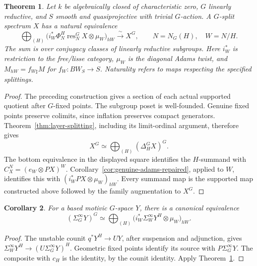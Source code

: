 \documentclass[11pt,reqno]{amsart}
\newtheorem{theorem}{Theorem}[section]
\newtheorem{corollary}[theorem]{Corollary}
\theoremstyle{definition}
\theoremstyle{remark}
\theoremstyle{plain}
\numberwithin{equation}{section}
\begin{document}
\begin{theorem}\label{thm:td-general}
Let \(k\) be algebraically closed of characteristic zero,
\(G\) linearly reductive, and \(S\) smooth and quasiprojective
with trivial \(G\)-action. A \(G\)-split spectrum \(X\) has a
natural equivalence
\[
 \bigoplus_{(H)}
 \bigl(i_W^*\Phi_N^H\operatorname{res}_N^G X
             \otimes\mu_W\bigr)_{hW}
 \xrightarrow{\ \sim\ }X^G,
 \qquad N=N_G(H),\quad W=N/H .
\]
The sum is over conjugacy classes of linearly reductive subgroups.
Here \(i_W^*\) is restriction to the free/lisse category,
\(\mu_W\) is the diagonal Adams twist, and
\(M_{hW}=f_{W\sharp}M\) for \(f_W:BW_S\to S\).
Naturality refers to maps respecting the specified splittings.
\end{theorem}

\begin{proof}
The preceding construction gives a section of each actual supported
quotient after \(G\)-fixed points. The subgroup poset is well-founded.
Genuine fixed points preserve colimits, since inflation preserves
compact generators. Theorem~\ref{thm:layer-splitting},
including its limit-ordinal argument, therefore gives
\[
 X^G\simeq\bigoplus_{(H)}(\Delta_H^G X)^G.
\]
The bottom equivalence in the displayed square identifies the
\(H\)-summand with \(C_X^N=(e_W\otimes PX)^W\).
Corollary~\ref{cor:genuine-adams-repaired}, applied to \(W\), identifies this with
\((i_W^*PX\otimes\mu_W)_{hW}\).
Every summand map is the supported map constructed above followed
by the family augmentation to \(X^G\).
\end{proof}

\begin{corollary}\label{cor:td-suspensions}
For a based motivic \(G\)-space \(Y\), there is a canonical equivalence
\[
 (\Sigma_G^\infty Y)^G\simeq
 \bigoplus_{(H)}
 \bigl(i_W^*\Sigma_W^\infty Y^H\otimes\mu_W\bigr)_{hW}.
\]
\end{corollary}

\begin{proof}
The unstable counit \(q^*Y^H\to UY\), after suspension and
adjunction, gives
\(\Sigma_W^\infty Y^H\to(U\Sigma_G^\infty Y)^H\).
Geometric fixed points identify its source with
\(P\Sigma_G^\infty Y\). The composite with \(c_H\) is the identity,
by the counit identity. Apply Theorem~\ref{thm:td-general}.
\end{proof}
\end{document}
